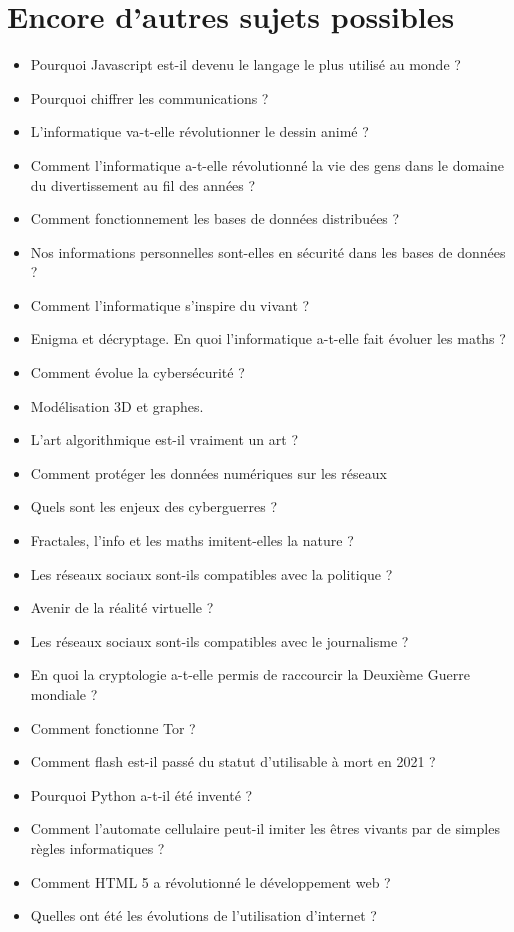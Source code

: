 \section{Encore d'autres sujets possibles}
\begin{itemize}
    \item Pourquoi Javascript est-il devenu le langage le plus utilisé au monde ?
    \item Pourquoi chiffrer les communications ?
    \item L'informatique va-t-elle révolutionner le dessin animé ?
    \item Comment l'informatique a-t-elle révolutionné la vie des gens dans le domaine du divertissement au fil des années ?
    \item Comment fonctionnement les bases de données distribuées ?
    \item Nos informations personnelles sont-elles en sécurité dans les bases de données ?
    \item Comment l'informatique s'inspire du vivant ?
    \item Enigma et décryptage. En quoi l'informatique a-t-elle fait évoluer les maths ?
    \item Comment évolue la cybersécurité ?
    \item Modélisation 3D et graphes.
    \item L'art algorithmique est-il vraiment un art ?
    \item Comment protéger les données numériques sur les réseaux
    \item Quels sont les enjeux des cyberguerres ?
    \item Fractales, l'info et les maths imitent-elles la nature ?
    \item Les réseaux sociaux sont-ils compatibles avec la politique ?
    \item Avenir de la réalité virtuelle ?
    \item Les réseaux sociaux sont-ils compatibles avec le journalisme ?
    \item En quoi la cryptologie a-t-elle permis de raccourcir la Deuxième Guerre mondiale ?
    \item Comment fonctionne Tor ?
    \item Comment flash est-il passé du statut d'utilisable à mort en 2021 ?
    \item Pourquoi Python a-t-il été inventé ?
    \item Comment l'automate cellulaire peut-il imiter les êtres vivants par de simples règles informatiques ?
    \item Comment HTML 5 a révolutionné le développement web ?
    \item Quelles ont été les évolutions de l'utilisation d'internet ?
\end{itemize}

